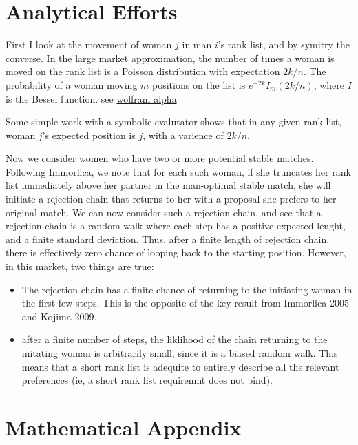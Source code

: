 \documentclass[WP]{AEA}
\begin{document}
\section{Analytical Efforts}

First I look at the movement of woman $j$ in man $i$'s rank list, and by symitry the converse. In the large market approximation, the number of times a woman is moved on the rank list is a Poisson distribution with expectation $2k/n$.  The probability of a woman moving $m$ positions on the list is $e^{-2k}I_m(2k/n)$, where $I$ is the Bessel function.  see \href{https://www.wolframalpha.com/input/?i=e%5E-10*BesselI%286%2C+10%29}{wolfram alpha}
	
Some simple work with a symbolic evalutator shows that in any given rank list, woman $j$'s expected position is $j$, with a varience of $2k/n$.
	
Now we consider women who have two or more potential stable matches.  Following Immorlica, we note that for each such woman, if she truncates her rank list immediately above her partner in the man-optimal stable match, she will initiate a rejection chain that returns to her with a proposal she prefers to her original match.	
We can now consider such a rejection chain, and see that a rejection chain is a random walk where each step has a positive expected lenght, and a finite standard deviation.  Thus, after a finite length of rejection chain, there is effectively zero chance of looping back to the starting position.  However, in this market, two things are true:
\begin{itemize}
	\item The rejection chain has a finite chance of returning to the initiating woman in the first few steps.  This is the opposite of the key result from Immorlica 2005 and Kojima 2009.
	\item after a finite number of steps, the liklihood of the chain returning to the initating woman is arbitrarily small, since it is a biased random walk. This means that a short rank list is adequite to entirely describe all the relevant preferences (ie, a short rank list requiremnt does not bind).
\end{itemize}






\appendix

\section{Mathematical Appendix}
\end{document}
